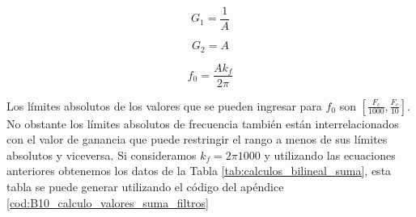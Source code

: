 	\begin{equation}
		G_{1} = \frac{1}{A}
	\end{equation}	
	
	\begin{equation}
		G_{2} = A
	\end{equation}
	
	\begin{equation}
		f_{0} = \frac{A k_{f}}{2 \pi}
	\end{equation}
	
	Los límites absolutos de los valores que se pueden ingresar para $f_{0}$ son $[\frac{F_{c}}{1000}, \frac{F_{c}}{10}]$. No obstante los límites absolutos de frecuencia también están interrelacionados con el valor de ganancia que puede restringir el rango a menos de sus límites absolutos y viceversa. Si consideramos $k_{f} = 2 \pi 1000$ y utilizando las ecuaciones anteriores obtenemos los datos de la Tabla \ref{tab:calculos_bilineal_suma}, esta tabla se puede generar utilizando el código del apéndice \ref{cod:B10_calculo_valores_suma_filtros}

